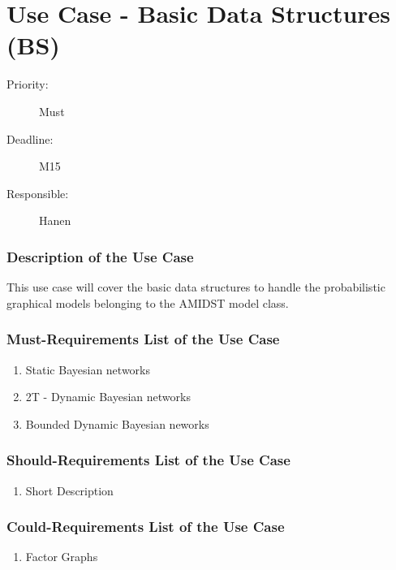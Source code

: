 \newpage
\section{Use Case - Basic Data Structures (BS)}
\label{UseCase:BS}

\begin{description}
\item[Priority:] Must
\item[Deadline:] M15
\item[Responsible:] Hanen
\end{description}

\subsubsection*{Description of the Use Case}

This use case will cover the basic data structures to handle the probabilistic graphical models belonging to the AMIDST model class.

\subsubsection*{Must-Requirements List of the Use Case}

\begin{enumerate}
\item Static Bayesian networks
\item 2T - Dynamic Bayesian networks
\item Bounded Dynamic Bayesian neworks
\end{enumerate}

\subsubsection*{Should-Requirements List of the Use Case}

\begin{enumerate}
\item Short Description
\end{enumerate}

\subsubsection*{Could-Requirements List of the Use Case}

\begin{enumerate}
\item Factor Graphs
\end{enumerate}



